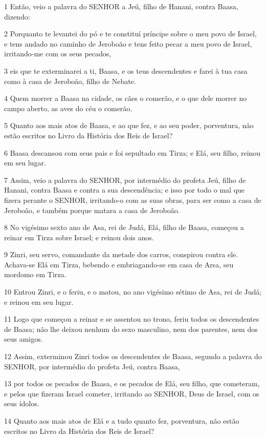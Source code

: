 \par 1 Então, veio a palavra do SENHOR a Jeú, filho de Hanani, contra Baasa, dizendo:
\par 2 Porquanto te levantei do pó e te constituí príncipe sobre o meu povo de Israel, e tens andado no caminho de Jeroboão e tens feito pecar a meu povo de Israel, irritando-me com os seus pecados,
\par 3 eis que te exterminarei a ti, Baasa, e os teus descendentes e farei à tua casa como à casa de Jeroboão, filho de Nebate.
\par 4 Quem morrer a Baasa na cidade, os cães o comerão, e o que dele morrer no campo aberto, as aves do céu o comerão.
\par 5 Quanto aos mais atos de Baasa, e ao que fez, e ao seu poder, porventura, não estão escritos no Livro da História dos Reis de Israel?
\par 6 Baasa descansou com seus pais e foi sepultado em Tirza; e Elá, seu filho, reinou em seu lugar.
\par 7 Assim, veio a palavra do SENHOR, por intermédio do profeta Jeú, filho de Hanani, contra Baasa e contra a sua descendência; e isso por todo o mal que fizera perante o SENHOR, irritando-o com as suas obras, para ser como a casa de Jeroboão, e também porque matara a casa de Jeroboão.
\par 8 No vigésimo sexto ano de Asa, rei de Judá, Elá, filho de Baasa, começou a reinar em Tirza sobre Israel; e reinou dois anos.
\par 9 Zinri, seu servo, comandante da metade dos carros, conspirou contra ele. Achava-se Elá em Tirza, bebendo e embriagando-se em casa de Arsa, seu mordomo em Tirza.
\par 10 Entrou Zinri, e o feriu, e o matou, no ano vigésimo sétimo de Asa, rei de Judá; e reinou em seu lugar.
\par 11 Logo que começou a reinar e se assentou no trono, feriu todos os descendentes de Baasa; não lhe deixou nenhum do sexo masculino, nem dos parentes, nem dos seus amigos.
\par 12 Assim, exterminou Zinri todos os descendentes de Baasa, segundo a palavra do SENHOR, por intermédio do profeta Jeú, contra Baasa,
\par 13 por todos os pecados de Baasa, e os pecados de Elá, seu filho, que cometeram, e pelos que fizeram Israel cometer, irritando ao SENHOR, Deus de Israel, com os seus ídolos.
\par 14 Quanto aos mais atos de Elá e a tudo quanto fez, porventura, não estão escritos no Livro da História dos Reis de Israel?
